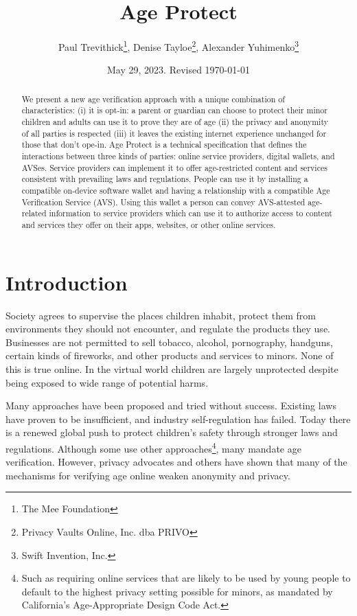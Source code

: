 \documentclass[11pt, oneside]{article}   	%
\title{Age Protect}
\author{Paul Trevithick\footnote{The Mee Foundation}, Denise Tayloe\footnote{Privacy Vaults Online, Inc. dba PRIVO}, Alexander Yuhimenko\footnote{Swift Invention, Inc.}}
\date{May 29, 2023. Revised \today}
\begin{document}
\maketitle
\begin{abstract}
	We present a new age verification approach with a unique combination of characteristics: (i) it is opt-in: a parent or guardian can choose to protect their minor children and adults can use it to prove they are of age (ii) the privacy and anonymity of all parties is respected (iii) it leaves the existing internet experience unchanged for those that don't ope-in. Age Protect is a technical specification that defines the interactions between three kinds of parties: online service providers, digital wallets, and AVSes. Service providers can implement it to offer age-restricted content and services consistent with prevailing laws and regulations. People can use it by installing a compatible on-device software wallet and having a relationship with a compatible Age Verification Service (AVS). Using this wallet a person can convey AVS-attested age-related information to service providers which can use it to authorize access to content and services they offer on their apps, websites, or other online services. 
\end{abstract}

\section{Introduction}

Society agrees to supervise the places children inhabit, protect them from environments they should not encounter, and regulate the products they use. Businesses are not permitted to sell tobacco, alcohol, pornography, handguns, certain kinds of fireworks, and other products and services to minors. None of this is true online. In the virtual world children are largely unprotected despite being exposed to wide range of potential harms. 

Many approaches have been proposed and tried without success. Existing laws have proven to be insufficient, and industry self-regulation has failed. Today there is a renewed global push to protect children's safety through stronger laws and regulations. Although some use other approaches\footnote{Such as requiring online services that are likely to be used by young people to default to the highest privacy setting possible for minors, as mandated by California's Age-Appropriate Design Code Act.}, many mandate age verification.\cite{Griswold2023}\cite{Jackson2023} However, privacy advocates and others have shown that many of the mechanisms for verifying age online weaken anonymity and privacy.\cite{Roth2023} 
\end{document}
